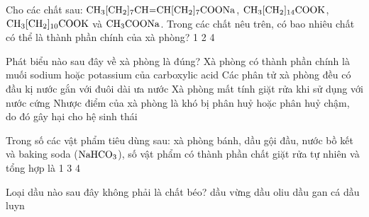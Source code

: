 \documentclass[12pt,a4paper]{article}
\begin{document}
\begin{ex}
Cho các chất sau: $\ce{CH3[CH2]7CH=CH[CH2]7COONa}$, $\ce{CH3[CH2]14COOK}$, $\ce{CH3[CH2]10COOK}$ và $\ce{CH3COONa}$. Trong các chất nêu trên, có bao nhiêu chất có thể là thành phần chính của xà phòng?
\choice
{1}
{2}
{}
{4}
\end{ex}

\begin{ex}
Phát biểu nào sau đây về xà phòng là đúng?
\choice
{Xà phòng có thành phần chính là muối sodium hoặc potassium của carboxylic acid}
{Các phân tử xà phòng đều có đầu kị nước gắn với đuôi dài ưa nước}
{\True Xà phòng mất tính giặt rửa khi sử dụng với nước cứng}
{Nhược điểm của xà phòng là khó bị phân huỷ hoặc phân huỷ chậm, do đó gây hại cho hệ sinh thái}
\end{ex}

\begin{ex}
Trong số các vật phẩm tiêu dùng sau: xà phòng bánh, dầu gội đầu, nước bồ kết và baking soda ($\ce{NaHCO3}$), số vật phẩm có thành phần chất giặt rửa tự nhiên và tổng hợp là
\choice
{1}
{}
{3}
{4}
\end{ex}

\begin{ex}
Loại dầu nào sau đây không phải là chất béo?
\choice
{dầu vừng}
{dầu oliu}
{dầu gan cá}
{\True dầu luyn}
\end{ex}
\end{document}
